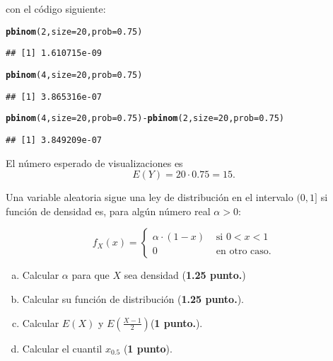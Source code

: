 \documentclass[12pt]{article}\usepackage[]{graphicx}\usepackage[]{color}
\makeatletter
\newcommand{\hlnum}[1]{\textcolor[rgb]{0.686,0.059,0.569}{#1}}%
\newcommand{\hlopt}[1]{\textcolor[rgb]{0,0,0}{#1}}%
\newcommand{\hlstd}[1]{\textcolor[rgb]{0.345,0.345,0.345}{#1}}%
\newcommand{\hlkwc}[1]{\textcolor[rgb]{0.333,0.667,0.333}{#1}}%
\newcommand{\hlkwd}[1]{\textcolor[rgb]{0.737,0.353,0.396}{\textbf{#1}}}%
\newenvironment{kframe}{%
 \def\at@end@of@kframe{}%
 \ifinner\ifhmode%
  \def\at@end@of@kframe{\end{minipage}}%
  \begin{minipage}{\columnwidth}%
 \fi\fi%
 \def\FrameCommand##1{\hskip\@totalleftmargin \hskip-\fboxsep
 \colorbox{shadecolor}{##1}\hskip-\fboxsep
     \hskip-\linewidth \hskip-\@totalleftmargin \hskip\columnwidth}%
 \MakeFramed {\advance\hsize-\width
   \@totalleftmargin\z@ \linewidth\hsize
   \@setminipage}}%
 {\par\unskip\endMakeFramed%
 \at@end@of@kframe}
\newenvironment{knitrout}{}{} %
\newcounter{problemes}
\newcounter{punts} \def\thepunts{\arabic{punts}}
\def\probl{\addtocounter{problemes}{1} \setcounter{punts}{0}
\medskip\noindent{\bf \theproblemes) }}
\makeatother
\begin{document}
con el código  siguiente:

\begin{knitrout}
\color{fgcolor}\begin{kframe}
\begin{alltt}
\hlkwd{pbinom}\hlstd{(}\hlnum{2}\hlstd{,}\hlkwc{size}\hlstd{=}\hlnum{20}\hlstd{,}\hlkwc{prob}\hlstd{=}\hlnum{0.75}\hlstd{)}
\end{alltt}
\begin{verbatim}
## [1] 1.610715e-09
\end{verbatim}
\begin{alltt}
\hlkwd{pbinom}\hlstd{(}\hlnum{4}\hlstd{,}\hlkwc{size}\hlstd{=}\hlnum{20}\hlstd{,}\hlkwc{prob}\hlstd{=}\hlnum{0.75}\hlstd{)}
\end{alltt}
\begin{verbatim}
## [1] 3.865316e-07
\end{verbatim}
\begin{alltt}
\hlkwd{pbinom}\hlstd{(}\hlnum{4}\hlstd{,}\hlkwc{size}\hlstd{=}\hlnum{20}\hlstd{,}\hlkwc{prob}\hlstd{=}\hlnum{0.75}\hlstd{)}\hlopt{-}\hlkwd{pbinom}\hlstd{(}\hlnum{2}\hlstd{,}\hlkwc{size}\hlstd{=}\hlnum{20}\hlstd{,}\hlkwc{prob}\hlstd{=}\hlnum{0.75}\hlstd{)}
\end{alltt}
\begin{verbatim}
## [1] 3.849209e-07
\end{verbatim}
\end{kframe}
\end{knitrout}

El número esperado de visualizaciones es 
$$E(Y)=20\cdot 0.75=15.$$

\probl Una variable aleatoria sigue una ley   de distribución  en el intervalo $(0,1]$ si función de densidad es, para algún número real $\alpha>0$:

$$
f_X(x)=\left\{
\begin{array}{ll}
\alpha \cdot (1-x)  & \mbox{ si } 0 < x < 1 \\
0 & \mbox{ en otro caso.}
\end{array}
\right.
$$

\begin{enumerate}[a)]
\item Calcular $\alpha$ para que $X$ sea densidad (\textbf{1.25 punto.})
\item Calcular su función de distribución (\textbf{1.25 punto.}).
\item Calcular $E(X)$ y $E\left(\frac{X-1}{2}\right)$(\textbf{1 punto.}).
\item Calcular el cuantil $x_{0.5}$ (\textbf{1 punto}).
\end{enumerate}
\end{document}
